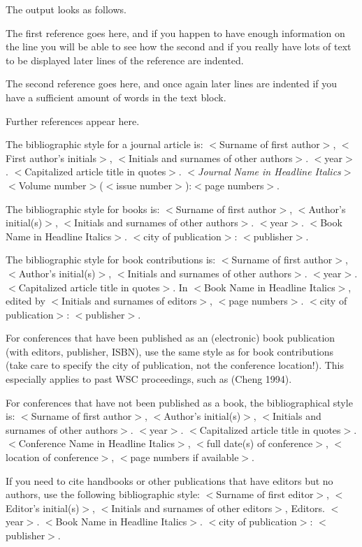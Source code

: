 \documentclass{wscpaperproc}
\theoremstyle{wsc}
\begin{document}
The output looks as follows.
\begin{hangref}
\item The first reference goes here, and if you happen to have enough 
information on the line you will be able to see how the second and if
you really have lots of text to be displayed later lines of the
reference are indented.
\item The second reference goes here, and once again later lines are
indented if you have a sufficient amount of words in the text block.
\item Further references appear here.
\end{hangref}

The bibliographic style for a journal article is: 
$<$Surname of first author$>$, $<$First author's initials$>$,
$<$Initials and surnames of other authors$>$. $<$year$>$.
$<$Capitalized article title in quotes$>$. $<${\em Journal Name in
Headline Italics}$>$ $<$Volume number$>$($<$issue number$>$):$<$page numbers$>$.

The bibliographic style for books is: 
$<$Surname of first author$>$, $<$Author’s initial(s)$>$, $<$Initials and surnames of other authors$>$. $<$year$>$. 
$<$Book Name in Headline Italics$>$. $<$city of publication$>$: $<$publisher$>$. 

The bibliographic style for book contributions is: 
$<$Surname of first author$>$, $<$Author’s initial(s)$>$, $<$Initials and surnames of other authors$>$. $<$year$>$. 
$<$Capitalized article title in quotes$>$. In $<$Book Name in Headline Italics$>$, 
edited by $<$Initials and surnames of editors$>$, $<$page numbers$>$. $<$city of publication$>$: $<$publisher$>$.

For conferences that have been published as an (electronic) book publication (with editors, publisher, ISBN),
use the same style as for book contributions (take care to specify the city of publication, not the conference location!). 
This especially applies to past WSC proceedings, such as (Cheng 1994). 

For conferences that have not been published as a book, the bibliographical style is: 
$<$Surname of first author$>$, $<$Author’s initial(s)$>$, $<$Initials and surnames of other authors$>$. $<$year$>$. 
$<$Capitalized article title in quotes$>$. $<$Conference Name in Headline Italics$>$, $<$full date(s) of conference$>$, 
$<$location of conference$>$, $<$page numbers if available$>$.

If you need to cite handbooks or other publications that have editors but no authors, use the following bibliographic style: 
$<$Surname of first editor$>$, $<$Editor’s initial(s)$>$, $<$Initials and surnames of other editors$>$, Editors. 
$<$year$>$. $<$Book Name in Headline Italics$>$. $<$city of publication$>$: $<$publisher$>$.
\end{document}
